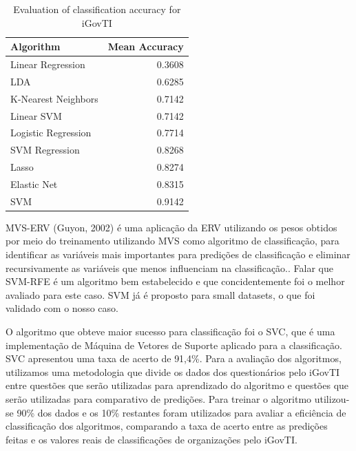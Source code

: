 \begin{table}[!t]
	\caption{Evaluation of classification accuracy for iGovTI}
  	\label{tab:ch2_tab3}
	\centering
	\begin{tabular}{|l|r|}
		\hline \rowcolor{Gray} Algorithm	& Mean Accuracy\\\hline
		Linear Regression \cite{draper2014applied}	&0.3608\\ \hline
		LDA \cite{martinez2001pca}	&0.6285\\ \hline
		K-Nearest Neighbors \cite{fukunaga1975branch}	&0.7142\\ \hline
		Linear SVM \cite{fan2008liblinear}	&0.7142\\ \hline
		Logistic Regression \cite{hosmer2013applied}	&0.7714\\ \hline
		SVM Regression \cite{smola2004tutorial}	&0.8268\\ \hline
		Lasso \cite{tibshirani1996regression}	&0.8274\\ \hline
		Elastic Net \cite{zou2005regularization}	&0.8315\\ \hline
		SVM \cite{hearst1998support}	&0.9142\\ \hline
	\end{tabular}
\end{table}

MVS-ERV (Guyon, 2002) é uma aplicação da ERV utilizando os pesos obtidos por meio do treinamento utilizando MVS como algoritmo de classificação, para identificar as variáveis mais importantes para predições de classificação e eliminar recursivamente as variáveis que menos influenciam na classificação.. Falar que SVM-RFE é um algoritmo bem estabelecido e que concidentemente foi o melhor avaliado para este caso. SVM já é proposto para small datasets, o que foi validado com o nosso caso.

O algoritmo que obteve maior sucesso para classificação foi o SVC, que é uma implementação de Máquina de Vetores de Suporte aplicado para a classificação. SVC apresentou uma taxa de acerto de 91,4\%. Para a avaliação dos algoritmos, utilizamos uma metodologia que divide os dados dos questionários pelo iGovTI entre questões que serão utilizadas para aprendizado do algoritmo e questões que serão utilizadas para comparativo de predições. Para treinar o algoritmo utilizou-se 90\% dos dados e os 10\% restantes foram utilizados para avaliar a eficiência de classificação dos algoritmos, comparando a taxa de acerto entre as predições feitas e os valores reais de classificações de organizações pelo iGovTI. 

